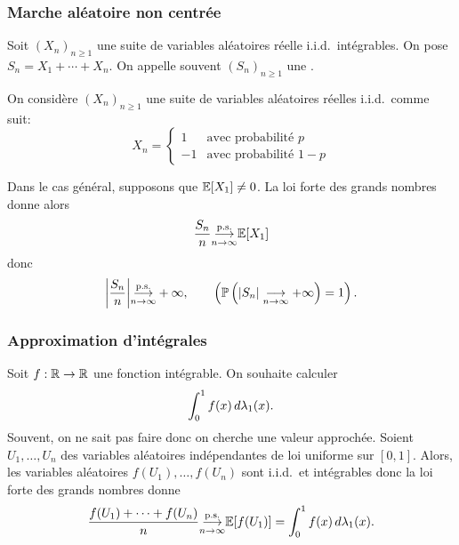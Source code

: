 \subsubsection*{Marche aléatoire non centrée\label{subsubsection:marche_aleatoire_non_centree}}
\setcounter{subsubsection}{1}

Soit \({(X_n)}_{n\geq 1}\) une suite de variables aléatoires
réelle i.i.d.\ intégrables. On pose \(S_n = X_1 + \cdots + X_n\).
On appelle souvent \({(S_n)}_{n\geq 1}\) une .

\begin{example}
    On considère \({(X_n)}_{n\geq 1}\) une suite de variables aléatoires
    réelles i.i.d.\ comme suit:
    \begin{equation*}
        X_n=\begin{cases}
            1 & \text{avec probabilité } p\\
            -1 & \text{avec probabilité } 1-p
        \end{cases}
    \end{equation*}

    

    Dans le cas général, supposons que \(\mathbb{E}[X_1] \neq 0\).
    La loi forte des grands nombres donne alors
    \begin{equation*}
        \frac{S_n}{n} \underset{n\to\infty}{{\overset{\text{p.s.}}{\longrightarrow}}} \mathbb{E}[X_1] 
    \end{equation*}
    donc
    \begin{equation*}
        \mathopen{}\left|\frac{S_n}{n}\right|\mathclose{} \underset{n\to\infty}{{\overset{\text{p.s.}}{\longrightarrow}}} +\infty,\qquad \left(\mathbb{P}\left(\mathopen{}\left|S_n\right|\mathclose{} \underset{n\to\infty}{\longrightarrow} +\infty\right) = 1\right). 
    \end{equation*}

    \subsubsection*{Approximation d'intégrales}\label{subsubsection:approximation_d_integrales}
    \setcounter{subsubsection}{2}

    Soit \(f:\mathbb{R}\to\mathbb{R}\) une fonction intégrable. On
    souhaite calculer
    \begin{equation*}
        \int_0^1 f(x) \mathop{}\!{d}\lambda_1(x).
    \end{equation*}
    Souvent, on ne sait pas faire donc on cherche une valeur
    approchée. Soient \(U_1,\ldots,U_n\) des variables
    aléatoires indépendantes de loi uniforme sur \([0,1]\).
    Alors, les variables aléatoires \(f(U_1),\ldots,f(U_n)\)
    sont i.i.d.\ et intégrables donc la loi forte des grands
    nombres donne
    \begin{equation*}
        \frac{f(U_1) + \cdots + f(U_n)}{n} \underset{n\to\infty}{{\overset{\text{p.s.}}{\longrightarrow}}} \mathbb{E}[f(U_1)] = \int_0^1 f(x) \mathop{}\!{d}\lambda_1(x).
    \end{equation*}


\end{example}
